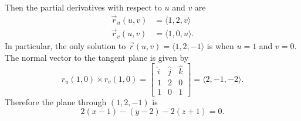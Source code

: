 \documentclass[12 pt]{article}
\begin{document}
\begin{enumerate}
		Then the partial derivatives with respect to $u$ and $v$ are \begin{align*}
			\vec r_u(u, v) &= \langle 1, 2, v \rangle \\
			\vec r_v(u, v) &= \langle 1, 0, u \rangle.
		\end{align*}
		In particular, the only solution to $\vec r(u, v) = \langle 1, 2, -1 \rangle$
		is when $u = 1$ and $v = 0$.
		The normal vector to the tangent plane is given by
		\[
			r_u(1, 0) \times r_v(1, 0) = \begin{bmatrix}
				\hat i & \hat j & \hat k \\
				1 & 2 & 0 \\
				1 & 0 & 1
			\end{bmatrix}
			= \langle 2, -1, -2 \rangle.
		\]
		Therefore the plane through $(1, 2, -1)$ is \[
			2(x - 1) - (y - 2) - 2(z + 1) = 0.
		\]
  \end{enumerate}
\end{document}
